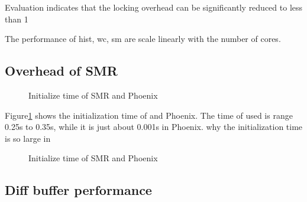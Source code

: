 {\color{red}\myds }
Evaluation indicates that
the locking overhead can be significantly reduced to less
than 1%





The performance of hist, wc, sm are scale linearly with the number of cores.


\subsection{Overhead of SMR}
\begin{figure}[htpb]
\centering
  \caption{Initialize time of SMR and Phoenix}
   \label{fig:init}
\end{figure}
Figure\ref{fig:init} shows the initialization time of \myds and Phoenix.
The time of \myds used is range 0.25s to  0.35s, 
while it is just about 0.001s in Phoenix.
{\color{red} why the initialization time is so large in \myds}

\begin{figure}[htpb]
\centering
  \caption{Initialize time of SMR and Phoenix}
   \label{fig:time}
\end{figure}

\subsection{Diff buffer performance}

